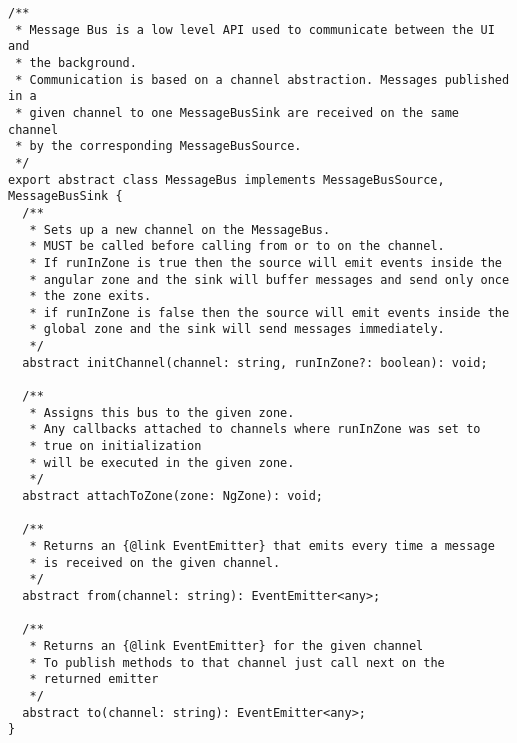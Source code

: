\begin{verbatim}
/**
 * Message Bus is a low level API used to communicate between the UI and
 * the background.
 * Communication is based on a channel abstraction. Messages published in a
 * given channel to one MessageBusSink are received on the same channel
 * by the corresponding MessageBusSource.
 */
export abstract class MessageBus implements MessageBusSource, MessageBusSink {
  /**
   * Sets up a new channel on the MessageBus.
   * MUST be called before calling from or to on the channel.
   * If runInZone is true then the source will emit events inside the
   * angular zone and the sink will buffer messages and send only once
   * the zone exits.
   * if runInZone is false then the source will emit events inside the
   * global zone and the sink will send messages immediately.
   */
  abstract initChannel(channel: string, runInZone?: boolean): void;

  /**
   * Assigns this bus to the given zone.
   * Any callbacks attached to channels where runInZone was set to
   * true on initialization
   * will be executed in the given zone.
   */
  abstract attachToZone(zone: NgZone): void;

  /**
   * Returns an {@link EventEmitter} that emits every time a message
   * is received on the given channel.
   */
  abstract from(channel: string): EventEmitter<any>;

  /**
   * Returns an {@link EventEmitter} for the given channel
   * To publish methods to that channel just call next on the
   * returned emitter
   */
  abstract to(channel: string): EventEmitter<any>;
}
\end{verbatim}
